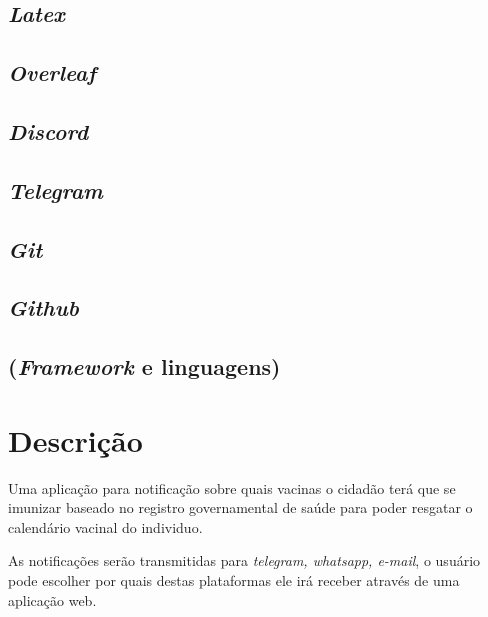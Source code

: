     \subsection{\textit{Latex}}
    
    \subsection{\textit{Overleaf}}
    
    \subsection{\textit{Discord}}
    
    \subsection{\textit{Telegram}}
    
    \subsection{\textit{Git}}
    
    \subsection{\textit{Github}}
    
    \subsection{(\textit{Framework} e linguagens)}


\section{Descrição}

Uma aplicação para notificação sobre quais vacinas o cidadão terá que se imunizar baseado no registro governamental de saúde para poder resgatar o calendário vacinal do individuo.

As notificações serão transmitidas para \textit{telegram, whatsapp, e-mail}, o usuário pode escolher por quais destas plataformas ele irá receber através de uma aplicação web.



